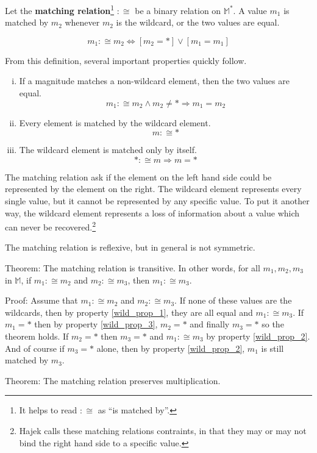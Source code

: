 \documentclass[twoside]{article}
\newcommand{\quotes}[1]{``#1''}
\begin{document}
Let the \textbf{matching relation}\footnote{It helps to read \(:\cong\) as \quotes{is matched by}.} \(:\cong\) be a binary relation on \(\mathbb{M}^*\). A value \(m_1\) is matched by \(m_2\) whenever \(m_2\) is the wildcard, or the two values are equal.

\[m_1 :\cong m_2 \Longleftrightarrow [m_2 = \ast] \vee [m_1 = m_1]\]

From this definition, several important properties quickly follow.
\begin{enumerate}[(i)]
  \item \label{wild_prop_1} If a magnitude matches a non-wildcard element, then the two values are equal. \[m_1 :\cong m_2 \wedge m_2 \neq \ast \Longrightarrow m_1 = m_2\]
  \item \label{wild_prop_2} Every element is matched by the wildcard element. \[m :\cong \ast\]
  \item \label{wild_prop_3} The wildcard element is matched only by itself. \[\ast :\cong m \Longrightarrow m = \ast\]
\end{enumerate}

The matching relation ask if the element on the left hand side could be represented by the element on the right. The wildcard element represents every single value, but it cannot be represented by any specific value. To put it another way, the wildcard element represents a loss of information about a value which can never be recovered.\footnote{Hajek\cite{hajek} calls these matching relations contraints, in that they may or may not bind the right hand side to a specific value.}

The matching relation is reflexive, but in general is not symmetric.

Theorem: The matching relation is transitive. In other words, for all \(m_1, m_2, m_3\) in \(\mathbb{M}\), if \(m_1 :\cong m_2\) and \(m_2 :\cong m_3\), then \(m_1 :\cong m_3\).

Proof: Assume that \(m_1 :\cong m_2\) and \(m_2 :\cong m_3\). If none of these values are the wildcards, then by property \ref{wild_prop_1}, they are all equal and \(m_1 :\cong m_3\). If \(m_1 = \ast\) then by property \ref{wild_prop_3}, \(m_2 = \ast\) and finally \(m_3 = \ast\) so the theorem holds. If \(m_2 = \ast\) then \(m_3 = \ast\) and \(m_1 :\cong m_3\) by property \ref{wild_prop_2}. And of course if \(m_3 = \ast\) alone, then by property \ref{wild_prop_2}, \(m_1\) is still matched by \(m_3\).

Theorem: The matching relation preserves multiplication.
\end{document}
